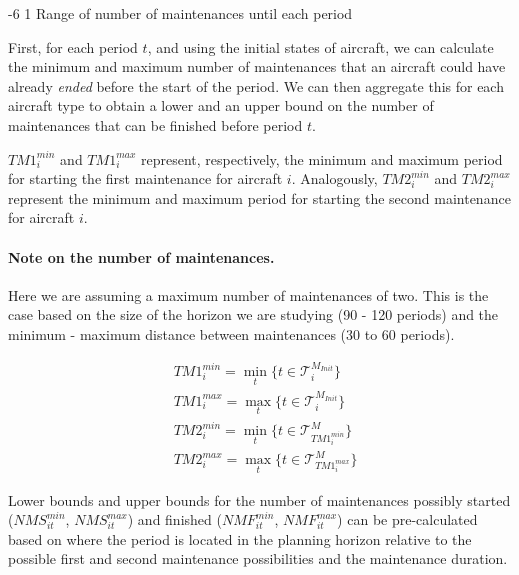 \documentclass[a4paper,onecolumn,fleqn]{article}
\makeatletter
\renewcommand\section{\@startsection{section}{1}{\z@}%
                       {-6\p@ \@plus -0\p@ \@minus -0\p@}%
                       {2\p@ \@plus 0\p@ \@minus 0\p@}%
                       {\normalsize\textbf}}
\renewcommand\section{\@startsection{section}{2}{\z@}%
                       {-6\p@ \@plus -0\p@ \@minus -0\p@}%
                       {2\p@ \@plus 0\p@ \@minus 0\p@}%
                       {\normalsize\textbf}}
\renewcommand\section{\@startsection{section}{3}{\z@}%
                       {-6\p@ \@plus -0\p@ \@minus -0\p@}%
                       {1\p@ \@plus 0\p@ \@minus 0\p@}%
                       {\normalsize\itshape\bfseries}}
\makeatother
\begin{document}
\section{Range of number of maintenances until each period}
\label{range-of-number-of-maintenances-per-period}

First, for each period $t$, and using the initial states of aircraft, we can calculate the minimum and maximum number of maintenances that an aircraft could have already \emph{ended} before the start of the period. We can then aggregate this for each aircraft type to obtain a lower and an upper bound on the number of maintenances that can be finished before period $t$. 

$TM1^{min}_i$ and $TM1^{max}_i$ represent, respectively, the minimum and maximum period for starting the first maintenance for aircraft $i$. Analogously, $TM2^{min}_i$ and $TM2^{max}_i$ represent the minimum and maximum period for starting the second maintenance for aircraft $i$.

\paragraph{Note on the number of maintenances.} Here we are assuming a maximum number of maintenances of two. This is the case based on the size of the horizon we are studying (90 - 120 periods) and the minimum - maximum distance between maintenances (30 to 60 periods).

\begin{align}
	& TM1^{min}_i = \min_t{\{t \in \mathcal{T}^{M_{Init}}_i\}} \\
  & TM1^{max}_i = \max_t{\{t \in \mathcal{T}^{M_{Init}}_i\}} \\
  & TM2^{min}_i = \min_t{\{t \in \mathcal{T}^M_{TM1^{min}_i}\}} \\
  & TM2^{max}_i = \max_t{\{t \in \mathcal{T}^M_{TM1^{max}_i}\}} %
\end{align}

Lower bounds and upper bounds for the number of maintenances possibly started ($NMS^{min}_{it}$, $NMS^{max}_{it}$) and finished ($NMF^{min}_{it}$, $NMF^{max}_{it}$) can be pre-calculated based on where the period is located in the planning horizon relative to the possible first and second maintenance possibilities and the maintenance duration.
\end{document}
